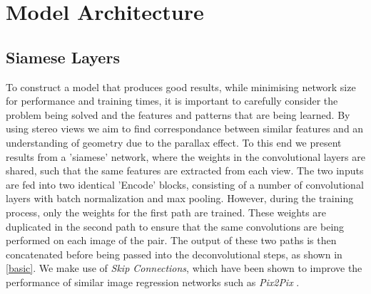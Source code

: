 \documentclass[ %
                    author={Gavin Parker},
                supervisor={Dr. Neill Campbell},
                    degree={MEng},
                     title={Deep Siamese Networks for Illumination Estimation from Stereo Images},
                  subtitle={},
                      type={research},
                      year={2018} ]{dissertation}
\begin{document}
\section{Model Architecture}
\subsection{Siamese Layers}
To construct a model that produces good results, while minimising network size for performance and training times, it is important to carefully consider the problem being solved and the features and patterns that are being learned. By using stereo views we aim to find correspondance between similar features and an understanding of geometry due to the parallax effect. To this end we present results from a 'siamese' network, where the weights in the convolutional layers are shared, such that the same features are extracted from each view. The two inputs are fed into two identical 'Encode' blocks, consisting of a number of convolutional layers with batch normalization and max pooling. However, during the training process, only the weights for the first path are trained. These weights are duplicated in the second path to ensure that the same convolutions are being performed on each image of the pair. The output of these two paths is then concatenated before being passed into the deconvolutional steps, as shown in \ref{basic}. We make use of \textit{Skip Connections}, which have been shown to improve the performance of similar image regression networks such as \textit{Pix2Pix} \cite{DBLP:journals/corr/IsolaZZE16}.
\newline
\end{document}
